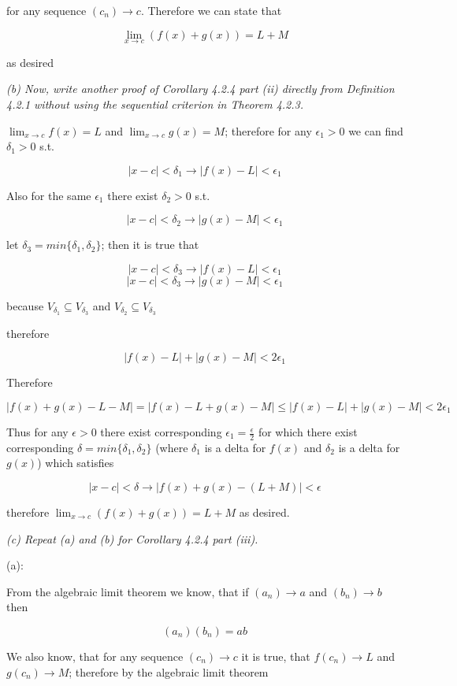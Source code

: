 \documentclass[11pt,oneside,titlepage]{article}
\begin{document}
for any sequence $(c_n) \to c$. Therefore we can state that

$$\lim_{x \to c}(f(x) + g(x)) = L + M $$

as desired

\textit{(b) Now, write another proof of Corollary 4.2.4 part (ii) directly from Definition 4.2.1 without using the sequential criterion in Theorem 4.2.3.}

$\lim_{x \to c} f(x) = L$ and $\lim_{x \to c} g(x) = M$; therefore for any $\epsilon_1 > 0$ we can find $\delta_1 > 0$ s.t.

$$ |x - c| < \delta_1 \to |f(x) - L| < \epsilon_1 $$

Also for the same $\epsilon_1$ there exist $\delta_2 > 0$ s.t.

$$ |x - c| < \delta_2 \to |g(x) - M| < \epsilon_1 $$

let $\delta_3 = min\{\delta_1, \delta_2\}$; then it is true that 

$$ |x - c| < \delta_3 \to |f(x) - L| < \epsilon_1 $$
$$ |x - c| < \delta_3 \to |g(x) - M| < \epsilon_1 $$

because $V_{\delta_1} \subseteq V_{\delta_3} $ and $V_{\delta_2} \subseteq V_{\delta_3} $

therefore

$$|f(x) - L| + |g(x) - M| < 2 \epsilon_1$$

Therefore 

$$ |f(x) + g(x) - L -  M| = |f(x) - L + g(x) - M| \leq |f(x) - L| + |g(x) - M| < 2 \epsilon_1 $$

Thus for any $\epsilon > 0$ there exist corresponding $\epsilon_1 = \frac{\epsilon}{2}$ for which there
exist corresponding $\delta = min\{\delta_1, \delta_2\}$ (where $\delta_1$ is a delta for $f(x)$ and
$\delta_2$ is a delta for $g(x)$) which satisfies

$$|x - c| < \delta \to |f(x) + g(x) - (L + M)| < \epsilon$$

therefore $\lim_{x \to c}(f(x) + g(x)) = L + M$ as desired.

\textit{(c) Repeat (a) and (b) for Corollary 4.2.4 part (iii).}

(a):

From the algebraic limit theorem we know, that if $(a_n) \to a$ and $(b_n) \to b$ then

$$(a_n) (b_n) = a  b$$

We also know, that for any sequence $(c_n) \to c$ it is true, that $f(c_n) \to L$ and $g(c_n) \to M$;
therefore by the algebraic limit theorem
\end{document}
